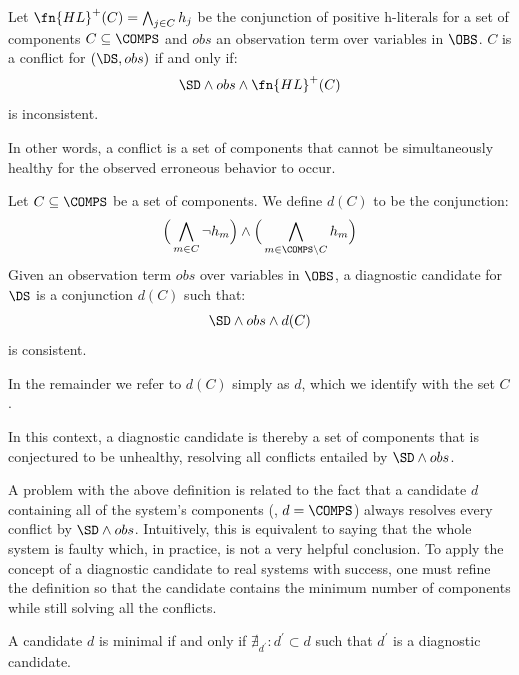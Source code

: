 \begin{definition}[Conflict]
  Let $\fn{HL}^+(C) = \bigwedge_{j \in C} h_j$ be the conjunction of
  positive h-literals for a set of components $C \subseteq \COMPS$ and
  $obs$ an observation term over variables in $\OBS$.  $C$ is a
  conflict for $(\DS, obs)$ if and only if:
  \begin{equation}
    \SD \wedge obs \wedge \fn{HL}^+(C)
  \end{equation}
  is inconsistent.
\end{definition}

In other words, a conflict is a set of components that cannot be
simultaneously healthy for the observed erroneous behavior
to occur.

\begin{definition}
  \label{def:intro:candidate}
  Let $C \subseteq \COMPS$ be a set of components.  We define $d(C)$
  to be the conjunction:
  \begin{equation}
    \Big(\bigwedge_{m \in C} \neg h_m\Big) \wedge
    \Big(\bigwedge_{m \in \COMPS \setminus C}  h_m\Big)
  \end{equation}
  Given an observation term $obs$ over variables in $\OBS$, a
  diagnostic candidate for $\DS$ is a conjunction $d(C)$
  such that:
  \begin{equation}
    \SD \wedge obs \wedge d(C)
  \end{equation}
  is consistent.

  In the remainder we refer to $d(C)$ simply as $d$, which
  we identify with the set $C$.
\end{definition}

In this context, a diagnostic candidate is thereby a set of components
that is conjectured to be unhealthy, resolving all conflicts entailed
by $\SD \wedge obs$.


A problem with the above definition is related to the fact that a
candidate $d$ containing all of the system's components (\ie, $d =
\COMPS$) always resolves every conflict by $\SD \wedge obs$.
%
Intuitively, this is equivalent to saying that the whole system is
faulty which, in practice, is not a very helpful conclusion.
%
To apply the concept of a diagnostic candidate to real systems with
success, one must refine the definition so that the candidate contains
the minimum number of components while still solving all the
conflicts.

\begin{definition}
  \label{def:intro:minimal-candidate}
  A candidate $d$ is minimal if and only if
  $\nexists_{d^\prime} : d^\prime \subset d$ such that $d^\prime$ is a diagnostic
  candidate.
\end{definition}

